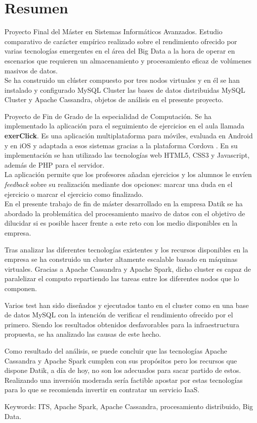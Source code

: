 \section*{Resumen}

Proyecto Final del Máster en Sistemas Informáticos Avanzados. Estudio comparativo de carácter empírico realizado sobre el rendimiento ofrecido por varias tecnologías emergentes en el área del Big Data a la hora de operar en escenarios que requieren un almacenamiento y procesamiento eficaz de volúmenes masivos de datos.\\

Se ha construido un clúster compuesto por tres nodos virtuales y en él se han instalado y configurado  MySQL Cluster  las bases de datos distribuidas MySQL Cluster y Apache Cassandra, objetos de análisis en el presente proyecto. 





Proyecto de Fin de Grado de la especialidad de Computación. Se ha implementado la aplicación para el seguimiento de ejercicios en el aula llamada \textbf{exerClick}. Es una aplicación multiplataforma para móviles, evaluada en Android y en iOS y adaptada a esos sistemas gracias a la plataforma Cordova \cite{apachecordova}. En su implementación se han utilizado las tecnologías web HTML5, CSS3 y Javascript, además de PHP para el servidor.\\

La aplicación permite que los profesores añadan ejercicios y los alumnos le envíen \textit{feedback} sobre su realización mediante dos opciones: marcar una duda en el ejercicio o marcar el ejercicio como finalizado.\\

En el presente trabajo de fin de máster desarrollado en la empresa Datik se ha abordado la problemática del procesamiento masivo de datos con el objetivo de dilucidar si es posible hacer frente a este reto con los medio disponibles en la empresa.

Tras analizar las diferentes tecnologías existentes y los recursos disponibles en la empresa se ha construido un cluster altamente escalable basado en máquinas virtuales. Gracias a Apache Cassandra y Apache Spark, dicho cluster es capaz de paralelizar el computo repartiendo las tareas entre los diferentes nodos que lo componen. 

Varios test han sido diseñados y ejecutados tanto en el cluster como en una base de datos MySQL con la intención de verificar el rendimiento ofrecido por el primero. Siendo los resultados obtenidos desfavorables para la infraestructura propuesta, se ha analizado las causas de este hecho. 

Como resultado del análisis, se puede concluir que las tecnologías Apache Cassandra y Apache Spark cumplen con sus propósitos pero los recursos que dispone Datik, a día de hoy, no son los adecuados para sacar partido de estos. Realizando una inversión moderada sería factible apostar por estas tecnologías para lo que se recomienda invertir en contratar un servicio IaaS.

Keywords: ITS, Apache Spark, Apache Cassandra, procesamiento distribuido, Big Data.
